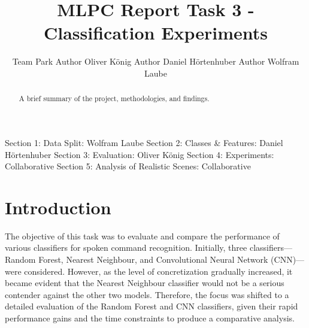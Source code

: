 \documentclass{article}
\title{MLPC Report Task 3 - Classification Experiments}
\author{%
  Team Park \And
  Author Oliver König \And
  Author Daniel Hörtenhuber \And
  Author Wolfram Laube
}
\begin{document}
\maketitle

\begin{abstract}
A brief summary of the project, methodologies, and findings.
\end{abstract}

\begin{contributions}
  Section 1: Data Split: Wolfram Laube \AND
  Section 2: Classes & Features: Daniel Hörtenhuber \AND
  Section 3: Evaluation: Oliver König \AND
  Section 4: Experiments: Collaborative \AND
  Section 5: Analysis of Realistic Scenes: Collaborative
\end{contributions}

\section{Introduction}
The objective of this task was to evaluate and compare the performance of various classifiers for spoken command recognition. Initially, three classifiers—Random Forest, Nearest Neighbour, and Convolutional Neural Network (CNN)—were considered. However, as the level of concretization gradually increased, it became evident that the Nearest Neighbour classifier would not be a serious contender against the other two models. Therefore, the focus was shifted to a detailed evaluation of the Random Forest and CNN classifiers, given their rapid performance gains and the time constraints to produce a comparative analysis.







\end{document}
